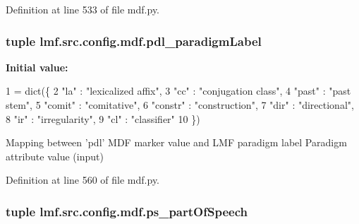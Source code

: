 Definition at line 533 of file mdf.\+py.

\hypertarget{namespacelmf_1_1src_1_1config_1_1mdf_a8e61adc475ca415a33c85ef16c96d03d}{
\subsubsection[{pdl\+\_\+paradigm\+Label}]{\setlength{\rightskip}{0pt plus 5cm}tuple lmf.\+src.\+config.\+mdf.\+pdl\+\_\+paradigm\+Label}}\label{namespacelmf_1_1src_1_1config_1_1mdf_a8e61adc475ca415a33c85ef16c96d03d}
{\bfseries Initial value\+:}
\begin{DoxyCode}
1 = dict(\{
2     \textcolor{stringliteral}{"la"}        : \textcolor{stringliteral}{"lexicalized affix"},
3     \textcolor{stringliteral}{"cc"}        : \textcolor{stringliteral}{"conjugation class"},
4     \textcolor{stringliteral}{"past"}      : \textcolor{stringliteral}{"past stem"},
5     \textcolor{stringliteral}{"comit"}     : \textcolor{stringliteral}{"comitative"},
6     \textcolor{stringliteral}{"constr"}    : \textcolor{stringliteral}{"construction"},
7     \textcolor{stringliteral}{"dir"}       : \textcolor{stringliteral}{"directional"},
8     \textcolor{stringliteral}{"ir"}        : \textcolor{stringliteral}{"irregularity"},
9     \textcolor{stringliteral}{"cl"}        : \textcolor{stringliteral}{"classifier"}
10 \})
\end{DoxyCode}


Mapping between 'pdl' M\+D\+F marker value and L\+M\+F paradigm label Paradigm attribute value (input) 



Definition at line 560 of file mdf.\+py.

\hypertarget{namespacelmf_1_1src_1_1config_1_1mdf_a1e76a452fc77f05851e4369134f5980b}{
\subsubsection[{ps\+\_\+part\+Of\+Speech}]{\setlength{\rightskip}{0pt plus 5cm}tuple lmf.\+src.\+config.\+mdf.\+ps\+\_\+part\+Of\+Speech}}\label{namespacelmf_1_1src_1_1config_1_1mdf_a1e76a452fc77f05851e4369134f5980b}


